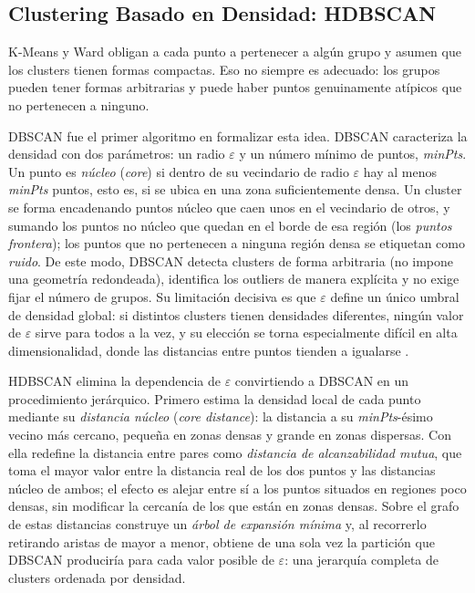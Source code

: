 \subsection{Clustering Basado en Densidad: HDBSCAN}
\label{subsec:hdbscan}

K-Means y Ward obligan a cada punto a pertenecer a algún grupo y asumen que los clusters tienen formas compactas. Eso no siempre es adecuado: los grupos pueden tener formas arbitrarias y puede haber puntos genuinamente atípicos que no pertenecen a ninguno.

DBSCAN \parencite{ester_1996_dbscan} fue el primer algoritmo en formalizar esta idea. DBSCAN caracteriza la densidad con dos parámetros: un radio $\varepsilon$ y un número mínimo de puntos, \textit{minPts}. Un punto es \textit{núcleo} (\textit{core}) si dentro de su vecindario de radio $\varepsilon$ hay al menos \textit{minPts} puntos, esto es, si se ubica en una zona suficientemente densa. Un cluster se forma encadenando puntos núcleo que caen unos en el vecindario de otros, y sumando los puntos no núcleo que quedan en el borde de esa región (los \textit{puntos frontera}); los puntos que no pertenecen a ninguna región densa se etiquetan como \textit{ruido}. De este modo, DBSCAN detecta clusters de forma arbitraria (no impone una geometría redondeada), identifica los outliers de manera explícita y no exige fijar el número de grupos. Su limitación decisiva es que $\varepsilon$ define un único umbral de densidad global: si distintos clusters tienen densidades diferentes, ningún valor de $\varepsilon$ sirve para todos a la vez, y su elección se torna especialmente difícil en alta dimensionalidad, donde las distancias entre puntos tienden a igualarse \parencite{aggarwal_2001_dimensionality}.

HDBSCAN \parencite{campello_2013_hdbscan} elimina la dependencia de $\varepsilon$ convirtiendo a DBSCAN en un procedimiento jerárquico. Primero estima la densidad local de cada punto mediante su \textit{distancia núcleo} (\textit{core distance}): la distancia a su \textit{minPts}-ésimo vecino más cercano, pequeña en zonas densas y grande en zonas dispersas. Con ella redefine la distancia entre pares como \textit{distancia de alcanzabilidad mutua}, que toma el mayor valor entre la distancia real de los dos puntos y las distancias núcleo de ambos; el efecto es alejar entre sí a los puntos situados en regiones poco densas, sin modificar la cercanía de los que están en zonas densas. Sobre el grafo de estas distancias construye un \textit{árbol de expansión mínima} y, al recorrerlo retirando aristas de mayor a menor, obtiene de una sola vez la partición que DBSCAN produciría para cada valor posible de $\varepsilon$: una jerarquía completa de clusters ordenada por densidad.

